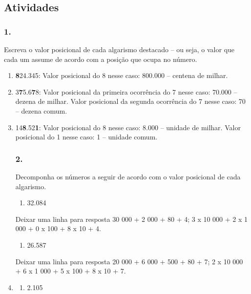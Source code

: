 \subsection{Atividades}\label{atividades}

\subsubsection{1.}\label{section}

Escreva o valor posicional de cada algarismo
destacado -- ou seja, o valor que cada um assume de acordo com a posição
que ocupa no número.

\begin{enumerate}
\def\labelenumi{\alph{enumi})}
\item
  \textbf{8}24.345:
  Valor posicional do 8 nesse caso: 800.000 -- centena de milhar.
\item
  3\textbf{7}5.6\textbf{7}8:
  Valor posicional da primeira ocorrência do 7 nesse caso: 70.000 -- dezena de milhar.
  Valor posicional da segunda ocorrência do 7 nesse caso: 70 -- dezena comum.
\item
  14\textbf{8}.52\textbf{1}:
  Valor posicional do 8 nesse caso: 8.000 -- unidade de milhar.
  Valor posicional do 1 nesse caso: 1 -- unidade comum.

\subsubsection{2.}\label{section-1}

Decomponha os números a seguir de acordo com o valor posicional de cada
algarismo.

\begin{enumerate}
\def\labelenumi{\alph{enumi})}
\item
  32.084
\end{enumerate}

Deixar uma linha para resposta
30 000 + 2 000 + 80 + 4; 3 x 10 000 + 2 x 1 000 + 0 x 100 + 8 x 10 + 4.

\begin{enumerate}
\def\labelenumi{\alph{enumi})}
\item
  26.587
\end{enumerate}

Deixar uma linha para resposta
20 000 + 6 000 + 500 + 80 + 7; 2 x 10 000 + 6 x 1 000 + 5 x 100 + 8
  x 10 + 7.
\item
  
\begin{enumerate}
\def\labelenumi{\alph{enumi})}
\item
  2.105
\end{enumerate}


\end{enumerate}
